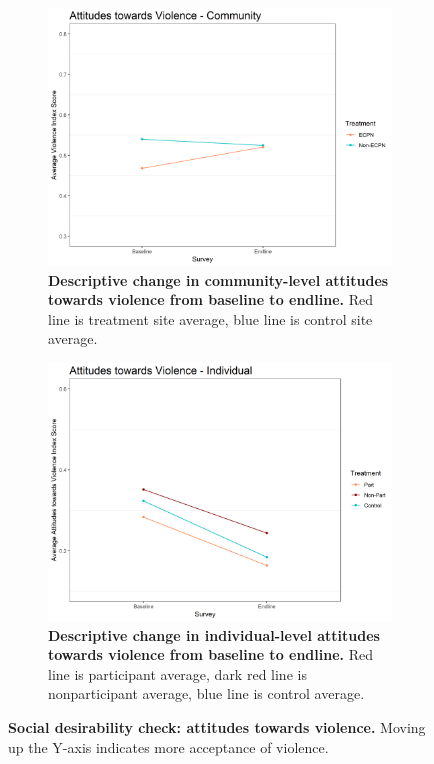 \documentclass[11pt]{article}
\begin{document}
\begin{figure}[H]
    \begin{subfigure}[b]{.48\textwidth}
    \centering
        \includegraphics[width=\linewidth]{../../../figs/vioComm_plot.png}
        \caption{\textbf{Descriptive change in community-level attitudes towards violence from baseline to endline.} Red line is treatment site average, blue line is control site average.}
        \label{fig:vio_comm}
    \end{subfigure}
    \hfill
    \begin{subfigure}[b]{.48\textwidth}
    \centering
        \includegraphics[width=\linewidth]{../../../figs/vioPan_plot.png}
        \caption{\textbf{Descriptive change in individual-level attitudes towards violence from baseline to endline.} Red line is participant average, dark red line is nonparticipant average, blue line is control average.}
        \label{fig:vio_ind}
    \end{subfigure}
    \caption{\textbf{Social desirability check: attitudes towards violence.}  Moving up the Y-axis indicates more acceptance of violence.}
\end{figure}
\end{document}
